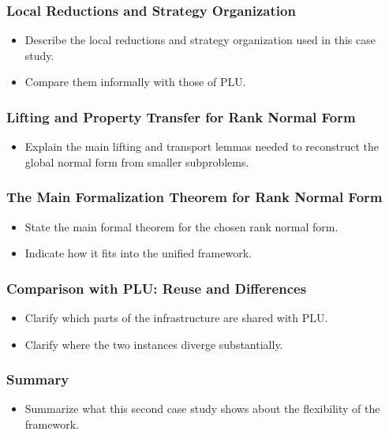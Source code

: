 \documentclass[pdflatex,sn-mathphys-num]{sn-jnl}%
\theoremstyle{thmstyleone}%
\theoremstyle{thmstyletwo}%
\theoremstyle{thmstylethree}%
\begin{document}
\subsubsection{Local Reductions and Strategy Organization}
\begin{itemize}
  \item Describe the local reductions and strategy organization used in this case study.
  \item Compare them informally with those of PLU.
\end{itemize}

\subsubsection{Lifting and Property Transfer for Rank Normal Form}
\begin{itemize}
  \item Explain the main lifting and transport lemmas needed to reconstruct the global normal form from smaller subproblems.
\end{itemize}

\subsubsection{The Main Formalization Theorem for Rank Normal Form}
\begin{itemize}
  \item State the main formal theorem for the chosen rank normal form.
  \item Indicate how it fits into the unified framework.
\end{itemize}

\subsubsection{Comparison with PLU: Reuse and Differences}
\begin{itemize}
  \item Clarify which parts of the infrastructure are shared with PLU.
  \item Clarify where the two instances diverge substantially.
\end{itemize}

\subsubsection{Summary}
\begin{itemize}
  \item Summarize what this second case study shows about the flexibility of the framework.
\end{itemize}
\end{document}
